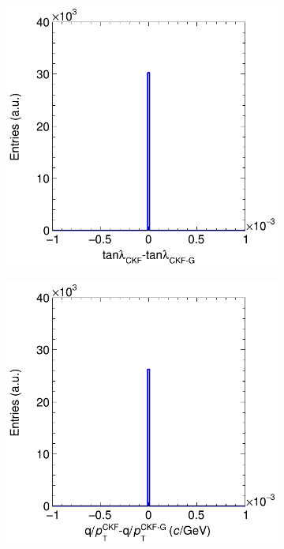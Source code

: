 \begin{figure}[t]
\begin{subfigure}{0.32\textwidth}
         \caption{}
         \label{fig:diff2_Integration}
     \end{subfigure}
     \begin{subfigure}{0.32\textwidth}
         \centering
         \includegraphics[width=\textwidth]{figures/ch5-KF_NDGAr/FullSample/Integration/ParDiffP3.png}
         \caption{}
         \label{fig:diff3_Integration}
     \end{subfigure}
    \begin{subfigure}{0.32\textwidth}
         \centering
         \includegraphics[width=\textwidth]{figures/ch5-KF_NDGAr/FullSample/Integration/ParDiffP4.png}

\end{subfigure}
\end{figure}

